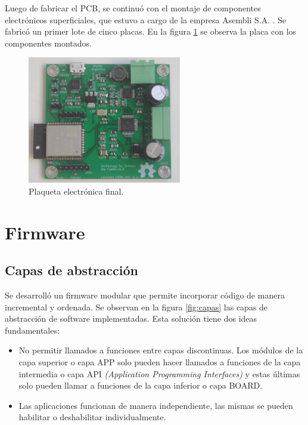 Luego de fabricar el PCB, se continuó con el montaje de componentes electrónicos superficiales, que estuvo a cargo de la empresa Asembli S.A. \citep{web_asembli}. Se fabricó un primer lote de cinco placas. En la figura \ref{fig:dip_real_model} se observa la placa con los componentes montados.


\begin{figure}[htbp]
	\centering
	\includegraphics[width=0.6\textwidth]{./Figures/dip_real_model.jpg}
	\caption{Plaqueta electrónica final.}
	\label{fig:dip_real_model}
\end{figure}


\section{Firmware}
\subsection{Capas de abstracción}

Se desarrolló un firmware modular que permite incorporar código de manera incremental y ordenada. Se observan en la figura \ref{fig:capas} las capas de abstracción de software implementadas. Esta solución tiene dos ideas fundamentales:

\begin{itemize}
\item No permitir llamados a funciones entre capas discontinuas. Los módulos de la capa superior o capa APP solo pueden hacer llamados a funciones de la capa intermedia o capa API \textit{(Application Programming Interfaces)} y estas últimas solo pueden llamar a funciones de la capa inferior o capa BOARD.
\item Las aplicaciones funcionan de manera independiente, las mismas se pueden habilitar o deshabilitar individualmente.
\end{itemize}


